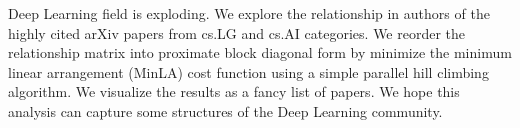Deep Learning field is exploding.
We explore the relationship in authors of the highly cited arXiv papers from cs.LG and cs.AI categories.
We reorder the relationship matrix into proximate block diagonal form by minimize the minimum linear arrangement (MinLA) cost function using a simple parallel hill climbing algorithm.
We visualize the results as a fancy list of papers.
We hope this analysis can capture some structures of the Deep Learning community.

